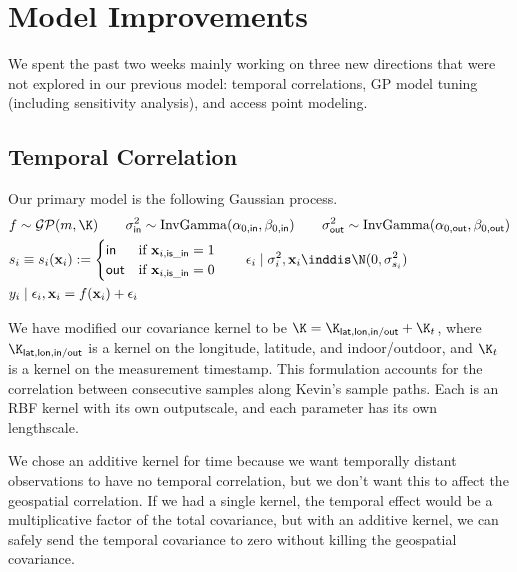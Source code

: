 \documentclass{article}
\newcommand{\bl}{\mathbf}
\newcommand{\sfio}{\mathsf{in/out}}
\newcommand{\sflat}{\mathsf{lat}}
\newcommand{\sflon}{\mathsf{lon}}
\begin{document}
\setcounter{section}{-1}

\section{Model Improvements}

We spent the past two weeks mainly working on three new directions that were not explored in our previous model: temporal correlations, GP model tuning (including sensitivity analysis), and access point modeling.

\subsection{Temporal Correlation}

Our primary model is the following Gaussian process.
\begin{align*}
    &f \sim \mathcal{GP}(m, \K) \qquad \sigma_\mathsf{in}^2 \sim \mathrm{InvGamma}(\alpha_{0,\mathsf{in}}, \beta_{0,\mathsf{in}}) \qquad \sigma_\mathsf{out}^2 \sim \mathrm{InvGamma}(\alpha_{0,\mathsf{out}}, \beta_{0,\mathsf{out}}) \\
    &s_i \equiv s_i(\bl{x}_i) := \begin{cases}
    \mathsf{in} &\text{if } \mathbf{x}_{i,\mathsf{is\_in}} = 1 \\
    \mathsf{out} &\text{if } \mathbf{x}_{i,\mathsf{is\_in}} = 0 \\
    \end{cases} \qquad \epsilon_i \mid \sigma_i^2, \bl{x}_i \inddis \N(0, \sigma_{s_i}^2) \\
    &y_i \mid \epsilon_i, \bl{x}_i = f(\bl{x}_i) + \epsilon_i
\end{align*}

We have modified our covariance kernel to be $\K = \K_{\sflat, \sflon, \sfio} + \K_t$, where $\K_{\sflat, \sflon, \sfio}$ is a kernel on the longitude, latitude, and indoor/outdoor, and $\K_t$ is a kernel on the measurement timestamp. This formulation accounts for the correlation between consecutive samples along Kevin's sample paths. Each is an RBF kernel with its own outputscale, and each parameter has its own lengthscale.

We chose an additive kernel for time because we want temporally distant observations to have no temporal correlation, but we don't want this to affect the geospatial correlation. If we had a single kernel, the temporal effect would be a multiplicative factor of the total covariance, but with an additive kernel, we can safely send the temporal covariance to zero without killing the geospatial covariance.
\end{document}
